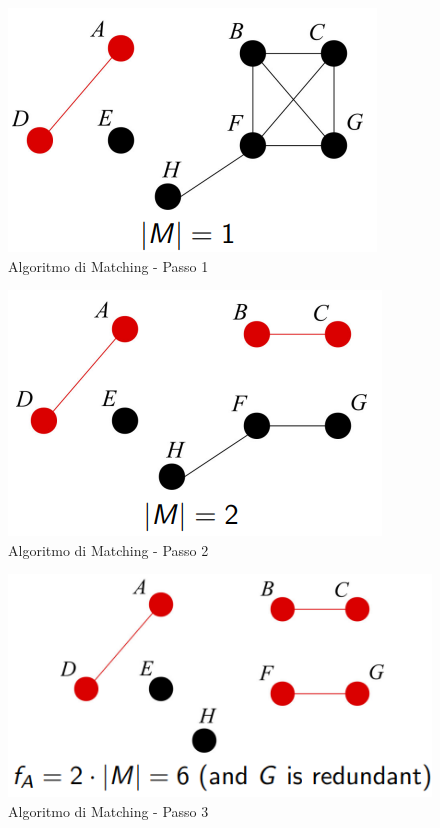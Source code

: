 \documentclass{article}
\begin{document}
\begin{figure}[H]
    \centering
    \includegraphics[scale=0.5]{images/matching_1.png}
    \caption{Algoritmo di Matching - Passo 1}
\end{figure}

\begin{figure}[H]
    \centering
    \includegraphics[scale=0.5]{images/matching_2.png}
    \caption{Algoritmo di Matching - Passo 2}
\end{figure}

\begin{figure}[H]
    \centering
    \includegraphics[scale=0.5]{images/matching_3.png}
    \caption{Algoritmo di Matching - Passo 3}
\end{figure}
\end{document}
